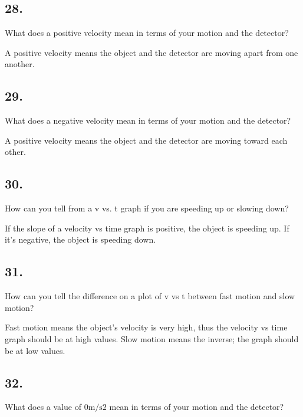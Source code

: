     \subsection*{28.}
    What does a positive velocity mean in terms of your motion and the detector? 

    \begin{mdframed}
        A positive velocity means the object and the detector are moving apart from one another.
    \end{mdframed}

    \subsection*{29.}
    What does a negative velocity mean in terms of your motion and the detector? 

    \begin{mdframed}
        A positive velocity means the object and the detector are moving toward each other.
    \end{mdframed}

    \subsection*{30.}
    How can you tell from a v vs. t graph if you are speeding up or slowing down?

    \begin{mdframed}
        If the slope of a velocity vs time graph is positive, the object is speeding up. If it's negative, the object is speeding down.
    \end{mdframed}

    \subsection*{31.}
    How can you tell the difference on a plot of v vs t between fast motion and slow motion?

    \begin{mdframed}
        Fast motion means the object's velocity is very high, thus the velocity vs time graph should be at high values. Slow motion means the inverse; the graph should be at low values.
    \end{mdframed}

    \subsection*{32.}
    What does a value of $0\text{m/s}2$ mean in terms of your motion and the detector?

